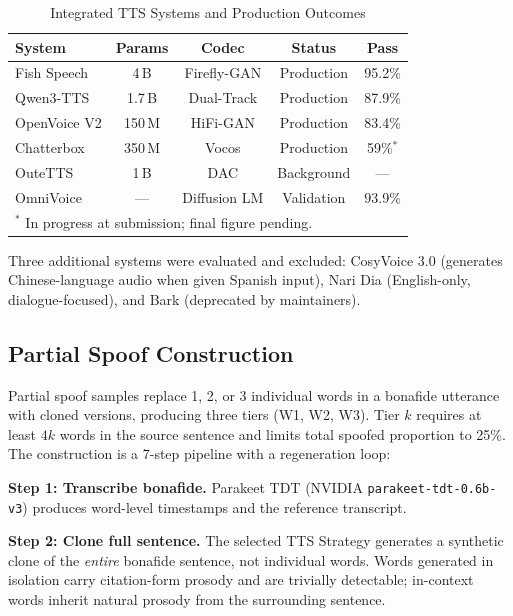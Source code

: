 \documentclass[conference]{IEEEtran}
\begin{document}
\begin{table}[t]
\caption{Integrated TTS Systems and Production Outcomes}
\label{tab:tts}
\centering
\small
\begin{tabular}{lcccc}
\toprule
\textbf{System} & \textbf{Params} & \textbf{Codec} & \textbf{Status} & \textbf{Pass} \\
\midrule
Fish Speech \cite{fishspeech} & 4\,B & Firefly-GAN & Production & 95.2\% \\
Qwen3-TTS \cite{qwen3tts} & 1.7\,B & Dual-Track & Production & 87.9\% \\
OpenVoice V2 \cite{openvoice} & 150\,M & HiFi-GAN & Production & 83.4\% \\
Chatterbox \cite{chatterbox} & 350\,M & Vocos & Production & 59\%${}^{*}$ \\
OuteTTS \cite{outetts} & 1\,B & DAC & Background & --- \\
OmniVoice \cite{omnivoice} & --- & Diffusion LM & Validation & 93.9\% \\
\bottomrule
\multicolumn{5}{l}{${}^{*}$ In progress at submission; final figure pending.}
\end{tabular}
\end{table}

Three additional systems were evaluated and excluded: CosyVoice 3.0 \cite{cosyvoice} (generates Chinese-language audio when given Spanish input), Nari Dia (English-only, dialogue-focused), and Bark (deprecated by maintainers).

\subsection{Partial Spoof Construction}

Partial spoof samples replace 1, 2, or 3 individual words in a bonafide utterance with cloned versions, producing three tiers (W1, W2, W3). Tier $k$ requires at least $4k$ words in the source sentence and limits total spoofed proportion to 25\%. The construction is a 7-step pipeline with a regeneration loop:

\textbf{Step 1: Transcribe bonafide.} Parakeet TDT (NVIDIA \texttt{parakeet-tdt-0.6b-v3}) produces word-level timestamps and the reference transcript.

\textbf{Step 2: Clone full sentence.} The selected TTS Strategy generates a synthetic clone of the \emph{entire} bonafide sentence, not individual words. Words generated in isolation carry citation-form prosody and are trivially detectable; in-context words inherit natural prosody from the surrounding sentence.
\end{document}
